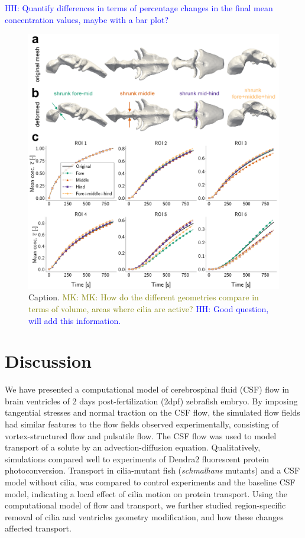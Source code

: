 \documentclass[fleqn]{wlscirep}
\newcommand{\lyng}[1]{\textcolor{blue}{#1}}
\newcommand{\mk}[1]{\textcolor{olive}{MK: #1}}
\begin{document}
\lyng{HH: Quantify differences in terms of percentage changes in the final mean concentration values, maybe with a bar plot?}
\begin{figure}[H]
    \centering
    \includegraphics[width=\textwidth]{graphics/figure6_compare_modified_geometries.png}
    \caption{Caption. \mk{MK: How do the different geometries compare in terms of volume, areas where cilia are active?} \lyng{HH: Good question, will add this information.}}
    \label{fig:figure6_sim_results_compare_geometries}
\end{figure}

\cleardoublepage


\section*{Discussion}
We have presented a computational model of cerebrospinal fluid (CSF) flow in brain ventricles of 2 days post-fertilization (2dpf) zebrafish embryo. By imposing tangential stresses and normal traction on the CSF flow, the simulated flow fields had similar features to the flow fields observed experimentally, consisting of vortex-structured flow and pulsatile flow. The CSF flow was used to model transport of a solute by an advection-diffusion equation. Qualitatively, simulations compared well to experiments of Dendra2 fluorescent protein photoconversion. Transport in cilia-mutant fish (\emph{schmalhans} mutants) and a CSF model without cilia, was compared to control experiments and the baseline CSF model, indicating a local effect of cilia motion on protein transport. Using the computational model of flow and transport, we further studied region-specific removal of cilia and ventricles geometry modification, and how these changes affected transport.
\end{document}

